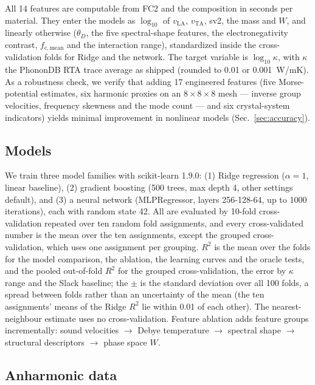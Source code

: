\documentclass[aps,prm,reprint,onecolumn,groupedaddress]{revtex4-2}
\begin{document}
All 14 features are computable from FC2 and the composition in seconds per material. They enter the models as $\log_{10}$ of $v_\mathrm{LA}$, $v_\mathrm{TA}$, sv2, the mass and $W$, and linearly otherwise ($\theta_D$, the five spectral-shape features, the electronegativity contrast, $f_\mathrm{c,mean}$ and the interaction range), standardized inside the cross-validation folds for Ridge and the network. The target variable is $\log_{10}\kappa$, with $\kappa$ the PhononDB RTA trace average as shipped (rounded to 0.01 or 0.001~W/mK). As a robustness check, we verify that adding 17 engineered features (five Morse-potential estimates, six harmonic proxies on an $8\times8\times8$ mesh --- inverse group velocities, frequency skewness and the mode count --- and six crystal-system indicators) yields minimal improvement in nonlinear models (Sec.~\ref{sec:accuracy}).

\subsection{Models}

We train three model families with scikit-learn 1.9.0: (1) Ridge regression ($\alpha = 1$, linear baseline), (2) gradient boosting (500 trees, max depth 4, other settings default), and (3) a neural network (MLPRegressor, layers 256-128-64, up to 1000 iterations), each with random state 42. All are evaluated by 10-fold cross-validation repeated over ten random fold assignments, and every cross-validated number is the mean over the ten assignments, except the grouped cross-validation, which uses one assignment per grouping. $R^2$ is the mean over the folds for the model comparison, the ablation, the learning curves and the oracle tests, and the pooled out-of-fold $R^2$ for the grouped cross-validation, the error by $\kappa$ range and the Slack baseline; the $\pm$ is the standard deviation over all 100 folds, a spread between folds rather than an uncertainty of the mean (the ten assignments' means of the Ridge $R^2$ lie within 0.01 of each other). The nearest-neighbour estimate uses no cross-validation. Feature ablation adds feature groups incrementally: sound velocities $\to$ Debye temperature $\to$ spectral shape $\to$ structural descriptors $\to$ phase space $W$.

\subsection{Anharmonic data}
\label{sec:anharm}
\end{document}
